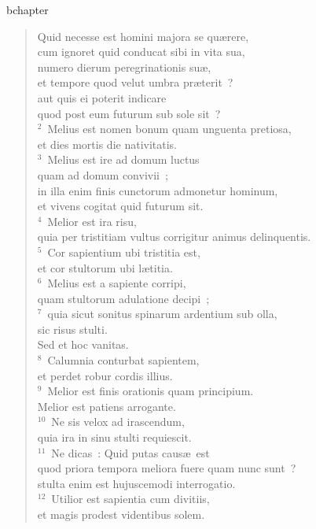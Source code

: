 bchapter\begin{verse}\vspace{-19pt}Quid necesse est homini majora se qu\ae rere,\\ cum ignoret quid conducat sibi in vita sua,\\ numero dierum peregrinationis su\ae ,\\ et tempore quod velut umbra pr\ae terit~?\\ aut quis ei poterit indicare\\ quod post eum futurum sub sole sit~?\\
${}^{2}$~Melius est nomen bonum quam unguenta pretiosa,\\ et dies mortis die nativitatis.\\
${}^{3}$~Melius est ire ad domum luctus\\ quam ad domum convivii~;\\ in illa enim finis cunctorum admonetur hominum,\\ et vivens cogitat quid futurum sit.\\
${}^{4}$~Melior est ira risu,\\ quia per tristitiam vultus corrigitur animus delinquentis.\\
${}^{5}$~Cor sapientium ubi tristitia est,\\ et cor stultorum ubi l\ae titia.\\
${}^{6}$~Melius est a sapiente corripi,\\ quam stultorum adulatione decipi~;\\
${}^{7}$~quia sicut sonitus spinarum ardentium sub olla,\\ sic risus stulti.\\ Sed et hoc vanitas.\\
${}^{8}$~Calumnia conturbat sapientem,\\ et perdet robur cordis illius.\\
${}^{9}$~Melior est finis orationis quam principium.\\ Melior est patiens arrogante.\\
${}^{10}$~Ne sis velox ad irascendum,\\ quia ira in sinu stulti requiescit.\\
${}^{11}$~Ne dicas~: Quid putas caus\ae\ est\\ quod priora tempora meliora fuere quam nunc sunt~?\\ stulta enim est hujuscemodi interrogatio.\\
${}^{12}$~Utilior est sapientia cum divitiis,\\ et magis prodest videntibus solem.\\

\end{verse}
